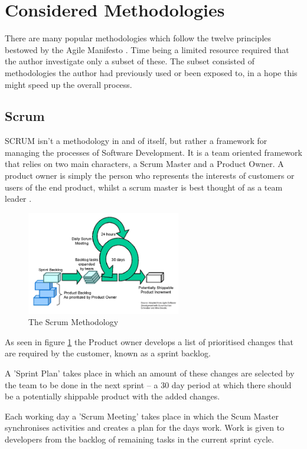 \documentclass[11pt]{book}
\begin{document}
\section{Considered Methodologies}
There are many popular methodologies which follow the twelve principles bestowed by the Agile Manifesto \cite{agilemanifesto}. Time being a limited resource required that the author investigate only a subset of these. The subset consisted of methodologies the author had previously used or been exposed to, in a hope this might speed up the overall process.

\subsection{Scrum}
SCRUM isn't a methodology in and of itself, but rather a framework for managing the processes of Software Development. It is a team oriented framework that relies on two main characters, a Scrum Master and a Product Owner. A product owner is simply the person who represents the interests of customers or users of the end product, whilst a scrum master is best thought of as a team leader \cite{thescrumguide}.
 
\begin{figure}[H]
	\centering
	\includegraphics[width=0.6\textwidth]{images/scrum}
	\caption{The Scrum Methodology \cite{scrumdiagram}}
	\label{fig:scrum}
\end{figure}

As seen in figure \ref{fig:scrum} the Product owner develops a list of prioritised changes that are required by the customer, known as a sprint backlog. 

A 'Sprint Plan' takes place in which an amount of these changes are selected by the team to be done in the next sprint -- a 30 day period at which there should be a potentially shippable product with the added changes.

Each working day a 'Scrum Meeting' takes place in which the Scum Master synchronises activities and creates a plan for the days work. Work is given to developers from the backlog of remaining tasks in the current sprint cycle.
\end{document}
